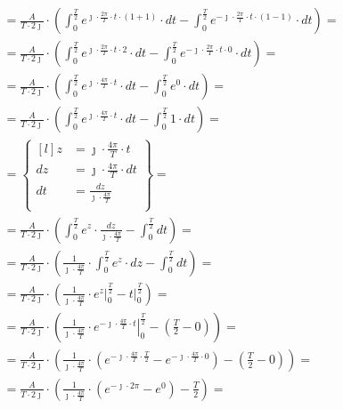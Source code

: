 \begin{task}
\begin{align*}
&=\frac{A}{T\cdot 2\jmath} \cdot \left( \int_{0}^{\frac{T}{2}}
e^{\jmath \cdot \frac{2\pi}{T} \cdot t \cdot \left(1 + 1\right)} \cdot dt - \int_{0}^{\frac{T}{2}} e^{-\jmath \cdot \frac{2\pi}{T} \cdot t \cdot \left(1-1\right)} \cdot dt \right)=\\
&=\frac{A}{T\cdot 2\jmath} \cdot \left( \int_{0}^{\frac{T}{2}}
e^{\jmath \cdot \frac{2\pi}{T} \cdot t \cdot 2} \cdot dt - \int_{0}^{\frac{T}{2}} e^{-\jmath \cdot \frac{2\pi}{T} \cdot t \cdot 0} \cdot dt \right)=\\
&=\frac{A}{T\cdot 2\jmath} \cdot \left( \int_{0}^{\frac{T}{2}} e^{\jmath \cdot \frac{4\pi}{T} \cdot t} \cdot dt - \int_{0}^{\frac{T}{2}}
e^{0} \cdot dt \right)=\\
&=\frac{A}{T\cdot 2\jmath} \cdot \left(\int_{0}^{\frac{T}{2}} e^{\jmath \cdot \frac{4\pi}{T} \cdot t} \cdot dt - \int_{0}^{\frac{T}{2}}
1 \cdot dt\right)=\\
&=\begin{Bmatrix*}[l]
z&=\jmath \cdot \frac{4\pi}{T} \cdot t\\
dz&=\jmath \cdot \frac{4\pi}{T} \cdot dt\\
dt&=\frac{dz}{\jmath \cdot \frac{4\pi}{T} }\\
\end{Bmatrix*}=\\
&=\frac{A}{T\cdot 2\jmath} \cdot \left( \int_{0}^{\frac{T}{2}} e^{z} \cdot \frac{dz}{\jmath \cdot \frac{4\pi}{T}} - \int_{0}^{\frac{T}{2}}
dt \right)=\\
&=\frac{A}{T\cdot 2\jmath} \cdot \left(\frac{1}{\jmath \cdot \frac{4\pi}{T}} \cdot \int_{0}^{\frac{T}{2}} e^{z} \cdot dz - \int_{0}^{\frac{T}{2}}
dt \right)=\\
&=\frac{A}{T\cdot 2\jmath} \cdot \left(\frac{1}{\jmath \cdot \frac{4\pi}{T}} \cdot \left. e^{z} \right|_{0}^{\frac{T}{2}} - \left. t \right|_{0}^{\frac{T}{2}} \right)=\\
&=\frac{A}{T\cdot 2\jmath} \cdot \left(\frac{1}{\jmath \cdot \frac{4\pi}{T}} \cdot \left. e^{-\jmath \cdot \frac{4\pi}{T} \cdot t} \right|_{0}^{\frac{T}{2}} - \left( \frac{T}{2}- 0 \right) \right)=\\
&=\frac{A}{T\cdot 2\jmath} \cdot \left( \frac{1}{\jmath \cdot \frac{4\pi}{T}} \cdot \left( e^{-\jmath \cdot \frac{4\pi}{T} \cdot \frac{T}{2}} - e^{-\jmath \cdot \frac{4\pi}{T} \cdot 0}\right) - \left( \frac{T}{2}- 0 \right) \right)=\\
&=\frac{A}{T\cdot 2\jmath} \cdot \left( \frac{1}{\jmath \cdot \frac{4\pi}{T}} \cdot \left( e^{-\jmath \cdot 2\pi} - e^{0}\right) - \frac{T}{2}\right)=\\

\end{align*}
\end{task}
